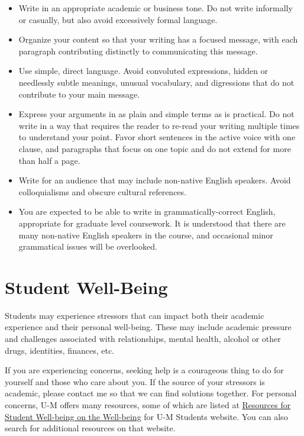 \documentclass[11pt]{article}
\begin{document}
\begin{itemize}
	\item Write in an appropriate academic or business tone. Do not write informally or casually, but also avoid excessively formal language.
	\item Organize your content so that your writing has a focused message, with each paragraph contributing distinctly to communicating this message.
	\item Use simple, direct language. Avoid convoluted expressions, hidden or needlessly subtle meanings, unusual vocabulary, and digressions that do not contribute to your main message.
	\item Express your arguments in as plain and simple terms as is practical. Do not write in a way that requires the reader to re-read your writing multiple times to understand your point. Favor short sentences in the active voice with one clause, and paragraphs that focus on one topic and do not extend for more than half a page.
	\item Write for an audience that may include non-native English speakers. Avoid colloquialisms and obscure cultural references.
	\item You are expected to be able to write in grammatically-correct English, appropriate for graduate level coursework. It is understood that there are many non-native English speakers in the course, and occasional minor grammatical issues will be overlooked.
\end{itemize}

\section*{Student Well-Being}

Students may experience stressors that can impact both their academic experience and their personal well-being. These may include academic pressure and challenges associated with relationships, mental health, alcohol or other drugs, identities, finances, etc.

If you are experiencing concerns, seeking help is a courageous thing to do for yourself and those who care about you. If the source of your stressors is academic, please contact me so that we can find solutions together. For personal concerns, U-M offers many resources, some of which are listed at \href{https://wellbeing.studentlife.umich.edu/resources-list}{Resources for Student Well-being on the Well-being} for U-M Students website. You can also search for additional resources on that website.
\end{document}
